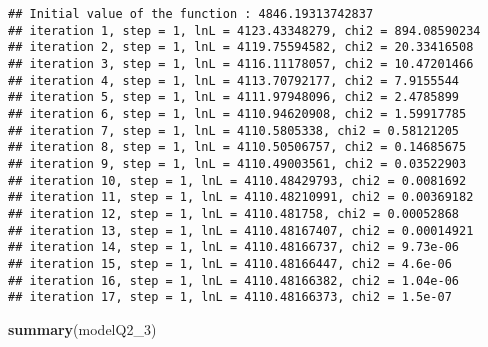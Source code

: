 \documentclass[
]{article}
\newenvironment{Shaded}{\begin{snugshade}}{\end{snugshade}}
\newcommand{\DecValTok}[1]{\textcolor[rgb]{0.00,0.00,0.81}{#1}}
\newcommand{\KeywordTok}[1]{\textcolor[rgb]{0.13,0.29,0.53}{\textbf{#1}}}
\newcommand{\NormalTok}[1]{#1}
\begin{document}
\begin{verbatim}
## Initial value of the function : 4846.19313742837 
## iteration 1, step = 1, lnL = 4123.43348279, chi2 = 894.08590234
## iteration 2, step = 1, lnL = 4119.75594582, chi2 = 20.33416508
## iteration 3, step = 1, lnL = 4116.11178057, chi2 = 10.47201466
## iteration 4, step = 1, lnL = 4113.70792177, chi2 = 7.9155544
## iteration 5, step = 1, lnL = 4111.97948096, chi2 = 2.4785899
## iteration 6, step = 1, lnL = 4110.94620908, chi2 = 1.59917785
## iteration 7, step = 1, lnL = 4110.5805338, chi2 = 0.58121205
## iteration 8, step = 1, lnL = 4110.50506757, chi2 = 0.14685675
## iteration 9, step = 1, lnL = 4110.49003561, chi2 = 0.03522903
## iteration 10, step = 1, lnL = 4110.48429793, chi2 = 0.0081692
## iteration 11, step = 1, lnL = 4110.48210991, chi2 = 0.00369182
## iteration 12, step = 1, lnL = 4110.481758, chi2 = 0.00052868
## iteration 13, step = 1, lnL = 4110.48167407, chi2 = 0.00014921
## iteration 14, step = 1, lnL = 4110.48166737, chi2 = 9.73e-06
## iteration 15, step = 1, lnL = 4110.48166447, chi2 = 4.6e-06
## iteration 16, step = 1, lnL = 4110.48166382, chi2 = 1.04e-06
## iteration 17, step = 1, lnL = 4110.48166373, chi2 = 1.5e-07
\end{verbatim}

\begin{Shaded}
\begin{Highlighting}[]
\KeywordTok{summary}\NormalTok{(modelQ2_}\DecValTok{3}\NormalTok{)}
\end{Highlighting}
\end{Shaded}
\end{document}

